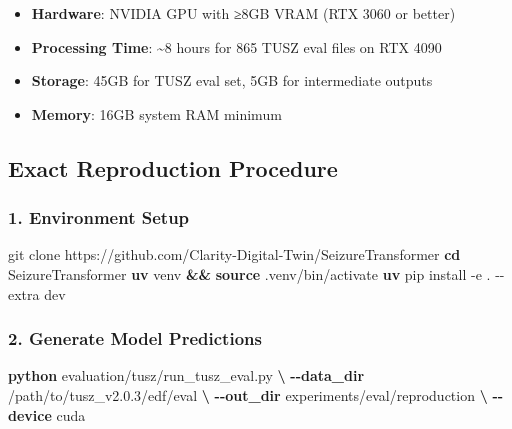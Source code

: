 \documentclass[
  10pt,
]{article}
\newenvironment{Shaded}{\begin{snugshade}}{\end{snugshade}}
\newcommand{\BuiltInTok}[1]{\textcolor[rgb]{0.39,0.29,0.61}{\textbf{#1}}}
\newcommand{\ExtensionTok}[1]{\textcolor[rgb]{0.00,0.58,1.00}{\textbf{#1}}}
\newcommand{\FunctionTok}[1]{\textcolor[rgb]{0.39,0.29,0.61}{#1}}
\newcommand{\KeywordTok}[1]{\textcolor[rgb]{0.12,0.11,0.11}{\textbf{#1}}}
\newcommand{\NormalTok}[1]{\textcolor[rgb]{0.12,0.11,0.11}{#1}}
\providecommand{\tightlist}{%
  \setlength{\itemsep}{0pt}\setlength{\parskip}{0pt}}
\begin{document}
\begin{itemize}
\tightlist
\item
  \textbf{Hardware}: NVIDIA GPU with ≥8GB VRAM (RTX 3060 or better)
\item
  \textbf{Processing Time}: \textasciitilde8 hours for 865 TUSZ eval
  files on RTX 4090
\item
  \textbf{Storage}: 45GB for TUSZ eval set, 5GB for intermediate outputs
\item
  \textbf{Memory}: 16GB system RAM minimum
\end{itemize}

\hypertarget{exact-reproduction-procedure}{%
\subsection{Exact Reproduction
Procedure}\label{exact-reproduction-procedure}}

\hypertarget{environment-setup}{%
\subsubsection{1. Environment Setup}\label{environment-setup}}

\begin{Shaded}
\begin{Highlighting}[]
\FunctionTok{git}\NormalTok{ clone https://github.com/Clarity{-}Digital{-}Twin/SeizureTransformer}
\BuiltInTok{cd}\NormalTok{ SeizureTransformer}
\ExtensionTok{uv}\NormalTok{ venv }\KeywordTok{\&\&} \BuiltInTok{source}\NormalTok{ .venv/bin/activate}
\ExtensionTok{uv}\NormalTok{ pip install {-}e . {-}{-}extra dev}
\end{Highlighting}
\end{Shaded}

\hypertarget{generate-model-predictions}{%
\subsubsection{2. Generate Model
Predictions}\label{generate-model-predictions}}

\begin{Shaded}
\begin{Highlighting}[]
\ExtensionTok{python}\NormalTok{ evaluation/tusz/run\_tusz\_eval.py }\KeywordTok{\textbackslash{}}
  \ExtensionTok{{-}{-}data\_dir}\NormalTok{ /path/to/tusz\_v2.0.3/edf/eval }\KeywordTok{\textbackslash{}}
  \ExtensionTok{{-}{-}out\_dir}\NormalTok{ experiments/eval/reproduction }\KeywordTok{\textbackslash{}}
  \ExtensionTok{{-}{-}device}\NormalTok{ cuda}
\end{Highlighting}
\end{Shaded}
\end{document}
